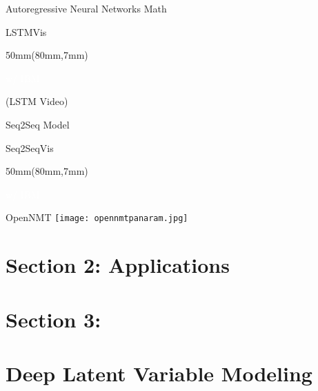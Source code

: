 \documentclass{beamer}
\def\research#1{\begin{textblock*}{50mm}(80mm,7mm)\centerline{\textcolor{white}{ \footnotesize #1}}\end{textblock*}}
\let\realcitet\citet
\renewcommand*{\citet}[1]{{\scriptsize \realcitet{#1}}}
\begin{document}
\begin{frame}{Autoregressive Neural Networks Math}

\end{frame}

\begin{frame}{LSTMVis}
  \research{\citet{Strobelt2016} w/ IBM}

  (LSTM Video)


\end{frame}


\begin{frame}{Seq2Seq Model}
\end{frame}

\begin{frame}{Seq2SeqVis}
  \research{\citet{strobelt2019s} w/ IBM}

  
\end{frame}


\begin{frame}{OpenNMT}
  \texttt{[image: opennmtpanaram.jpg]}
\end{frame}


\section{Section 2: Applications}
\begin{frame}

\end{frame}

\section{Section 3:}

\section{Deep Latent Variable Modeling}

\begin{frame}

\end{frame}

\begin{frame}

\end{frame}

\begin{frame}

\end{frame}
\end{document}
